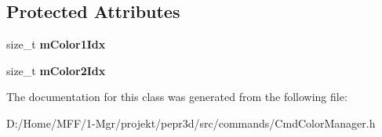 \subsection*{Protected Attributes}
\begin{DoxyCompactItemize}
\item 
\mbox{\label{classpepr3d_1_1_cmd_color_manager_reorder_colors_af50083a6f91b8cd5e105ad3e0a572630}} 
size\+\_\+t {\bfseries m\+Color1\+Idx}
\item 
\mbox{\label{classpepr3d_1_1_cmd_color_manager_reorder_colors_ab20fc791088ea8c6e73cc809f57fce1b}} 
size\+\_\+t {\bfseries m\+Color2\+Idx}
\end{DoxyCompactItemize}


The documentation for this class was generated from the following file\+:\begin{DoxyCompactItemize}
\item 
D\+:/\+Home/\+M\+F\+F/1-\/\+Mgr/projekt/pepr3d/src/commands/Cmd\+Color\+Manager.\+h\end{DoxyCompactItemize}
